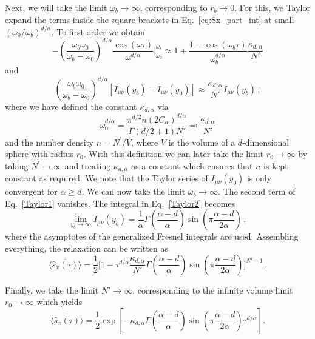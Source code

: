 \documentclass[aps,twocolumn,
superscriptaddress,
footinbib,
prl]{revtex4-1}
\begin{document}
Next, we will take the limit $\omega_b \to \infty$, corresponding to $r_b\to 0$. For this, we 
Taylor expand the terms inside the square brackets in Eq.~\eqref{eq:Sx_part_int} at small $(\omega_0/\omega_b)^{d/\alpha}$. To first order we obtain
\begin{equation}
\label{Taylor1}
    -\left( \frac{\omega_b \omega_0}{\omega_b - \omega _0}\right) ^{d/\alpha }\frac{\cos(\omega \tau)}{\omega^{d/\alpha}}  \Big|_{\omega_0}^{\omega_b} \approx 1 + \frac{1 - \cos(\omega_b \tau)}{\omega_b^{d/\alpha}}\frac{\kappa_{d,\alpha}}{N'}
\end{equation}
and
\begin{equation}
\label{Taylor2}
    \left( \frac{\omega_b \omega_0}{\omega_b - \omega _0}\right)^{d/\alpha}  \left[I_{\mu\nu}(y_b) - I_{\mu\nu}(y_0)\right] 
     \approx \frac{\kappa_{d,\alpha}}{N'}I_{\mu\nu}(y_b) \,,
\end{equation}
where we have defined the constant $\kappa_{d,\alpha}$ via
\begin{equation}
\label{VolumeInequ}
    \omega_0^{d/\alpha} = \frac{\pi ^{d/2} n  (2 C_\alpha)^{d/\alpha}}{\Gamma(d/2 +1) N'}  \eqqcolon \frac{\kappa_{d,\alpha}}{N'}
\end{equation}
and the number density $n=N^\prime/V$, where $V$ is the volume of a $d$-dimensional sphere with radius $r_0$. With this definition we can later take the limit $r_0\to \infty$ by taking $N^\prime\to\infty$ and treating $\kappa_{d,\alpha}$ as a constant which ensures that $n$ is kept constant as required. 
We note that the Taylor series of $I_{\mu\nu}(y_0)$ is only convergent for $\alpha \geq d$.
%
We can now take the limit $\omega_b \to \infty$. The second term of Eq.~\eqref{Taylor1} vanishes. The integral in Eq.~\eqref{Taylor2} becomes
\begin{equation}
    \lim_{y_b\to \infty} I_{\mu\nu}(y_b) = \frac{1}{\alpha} \Gamma\left(\frac{\alpha -d}{\alpha}\right) \sin( \pi \frac{\alpha -d }{2\alpha }) \,,
\end{equation}
where the asymptotes of the generalized Fresnel integrals \cite{mathar2012series} are used. Assembling everything, the relaxation can be written as 
\begin{equation}
\label{penultimate}
     \overline{\langle \hat{s}_x(\tau) \rangle} =  \frac{1}{2}\Big[1 - \tau^{d/\alpha}  \frac{\kappa_{d,\alpha}}{N'} \Gamma\left(\frac{\alpha -d}{\alpha}\right) \sin (\pi \frac{\alpha -d }{2\alpha })\Big]^{N'-1} \,. 
\end{equation}

Finally, we take the limit $N' \to \infty$, corresponding to the infinite volume limit $r_0\to\infty$ which yields
\begin{equation}
\label{eq:Sx_result_supp}
    \overline{\langle \hat{s}_x(\tau) \rangle} = \frac{1}{2} \exp\left[-\kappa_{d,\alpha} \Gamma\left(\frac{\alpha -d}{\alpha}\right) \sin (\pi \frac{\alpha -d }{2\alpha })\tau^{d/\alpha} \right]. 
\end{equation}
\end{document}
